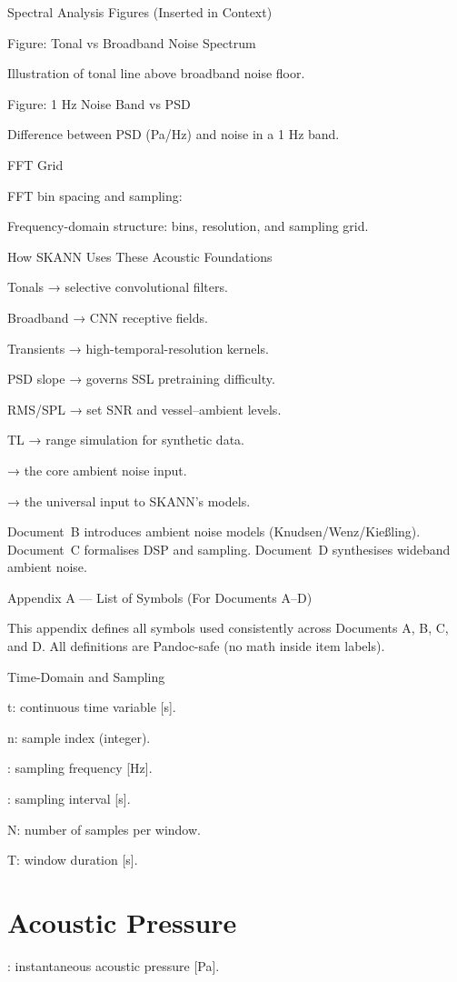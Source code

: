 \documentclass[12pt]{article}
\begin{document}
Spectral Analysis Figures (Inserted in Context)

Figure: Tonal vs Broadband Noise Spectrum

Illustration of tonal line above broadband noise floor.

Figure: 1 Hz Noise Band vs PSD

Difference between PSD (Pa/Hz) and noise in a 1 Hz band.

FFT Grid

FFT bin spacing and sampling:


Frequency-domain structure: bins, resolution, and sampling grid.

How SKANN Uses These Acoustic Foundations

Tonals → selective convolutional filters.

Broadband → CNN receptive fields.

Transients → high-temporal-resolution kernels.

PSD slope → governs SSL pretraining difficulty.

RMS/SPL → set SNR and vessel–ambient levels.

TL → range simulation for synthetic data.

→ the core ambient noise input.

→ the universal input to SKANN’s models.

Document B introduces ambient noise models (Knudsen/Wenz/Kießling). Document C formalises DSP and sampling. Document D synthesises wideband ambient noise.

Appendix A — List of Symbols (For Documents A–D)

This appendix defines all symbols used consistently across Documents A, B, C, and D. All definitions are Pandoc-safe (no math inside item labels).

Time-Domain and Sampling

t: continuous time variable [s].

n: sample index (integer).

: sampling frequency [Hz].

: sampling interval  [s].

N: number of samples per window.

T: window duration  [s].

\section*{Acoustic Pressure}
: instantaneous acoustic pressure [Pa].
\end{document}
